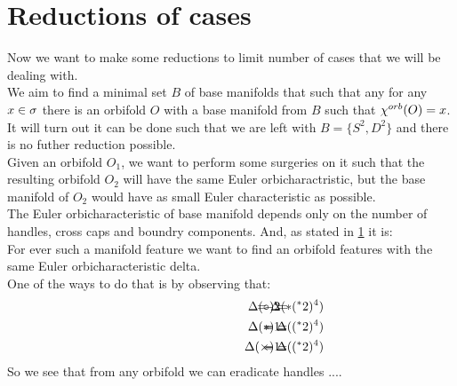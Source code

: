 


\section{Reductions of cases}
Now we want to make some reductions to limit number of cases that we will be dealing with. \\ 
We aim to find a minimal set $B$ of base manifolds that such that any for any $x \in {\sigma}$ there 
is an orbifold $O$ with a base manifold from $B$ such that ${\chi^{orb}(O)} = x$.
It will turn out it can be done such that we are left with $B = \{S^2, D^2\}$ and there is 
no futher reduction possible. \\ 
Given an orbifold $O_1$, we want to perform some surgeries on it such that the resulting orbifold 
$O_2$ will have the same Euler orbicharactristic, but the base manifold of $O_2$ would have as 
small Euler characteristic as possible. \\ 
The Euler orbicharacteristic of base manifold depends only on the number of handles, cross caps 
and boundry components. And, as stated in \ref{} it is: \\ 
For ever such a manifold feature we want to find an orbifold features with the same 
Euler orbicharacteristic delta.  \\
One of the ways to do that is by observing that:
\begin{align}
\hspace{3cm}\Delta(\circ) =& \hspace{-1cm} &-2& \hspace{-1cm} &= \Delta(\ast (^\ast 2)^4) \\
\hspace{3cm}\Delta(\ast) =& \hspace{-1cm} &-1& \hspace{-1cm} &= \Delta((^\ast 2)^4) \\
\hspace{3cm}\Delta(\times) =& \hspace{-1cm} &-1& \hspace{-1cm} &= \Delta((^\ast 2)^4)
\end{align}
So we see that from any orbifold we can eradicate handles ....       

